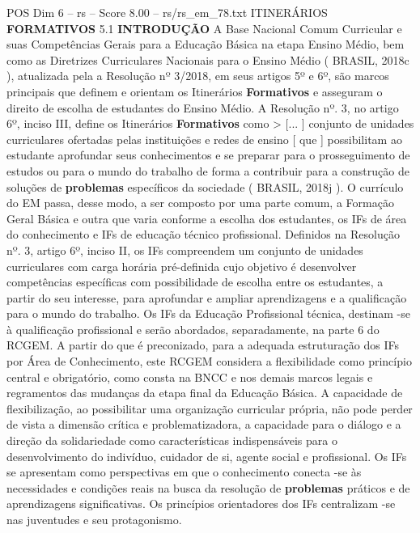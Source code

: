 \begin{textsample}{POS Dim 6 – rs – Score 8.00 – rs/rs\_em\_78.txt}  \label{ex:f6_pos_184}
ITINERÁRIOS \textbf{FORMATIVOS} 5.1 \textbf{INTRODUÇÃO} A Base Nacional Comum Curricular e suas Competências Gerais para a Educação Básica na etapa Ensino Médio, bem como as Diretrizes Curriculares Nacionais para o Ensino Médio ( BRASIL, 2018c ), atualizada pela a Resolução nº 3/2018, em seus artigos 5º e 6º, são marcos principais que definem e orientam os Itinerários \textbf{Formativos} e asseguram o direito de escolha de estudantes do Ensino Médio.
A Resolução nº. 3, no artigo 6º, inciso III, define os Itinerários \textbf{Formativos} como > [... ] conjunto de unidades curriculares ofertadas pelas instituições e redes de ensino [ que ] possibilitam ao estudante aprofundar seus conhecimentos e se preparar para o prosseguimento de estudos ou para o mundo do trabalho de forma a contribuir para a construção de soluções de \textbf{problemas} específicos da sociedade ( BRASIL, 2018j ).
O currículo do EM passa, desse modo, a ser composto por uma parte comum, a Formação Geral Básica e outra que varia conforme a escolha dos estudantes, os IFs de área do conhecimento e IFs de educação técnico profissional.
Definidos na Resolução nº. 3, artigo 6º, inciso II, os IFs compreendem um conjunto de unidades curriculares com carga horária pré-definida cujo objetivo é desenvolver competências específicas com possibilidade de escolha entre os estudantes, a partir do seu interesse, para aprofundar e ampliar aprendizagens e a qualificação para o mundo do trabalho.
Os IFs da Educação Profissional técnica, destinam -se à qualificação profissional e serão abordados, separadamente, na parte 6 do RCGEM.
A partir do que é preconizado, para a adequada estruturação dos IFs por Área de Conhecimento, este RCGEM considera a flexibilidade como princípio central e obrigatório, como consta na BNCC e nos demais marcos legais e regramentos das mudanças da etapa final da Educação Básica.
A capacidade de flexibilização, ao possibilitar uma organização curricular própria, não pode perder de vista a dimensão crítica e problematizadora, a capacidade para o diálogo e a direção da solidariedade como características indispensáveis para o desenvolvimento do indivíduo, cuidador de si, agente social e profissional.
Os IFs se apresentam como perspectivas em que o conhecimento conecta -se às necessidades e condições reais na busca da resolução de \textbf{problemas} práticos e de aprendizagens significativas.
Os princípios orientadores dos IFs centralizam -se nas juventudes e seu protagonismo.

\end{textsample}
